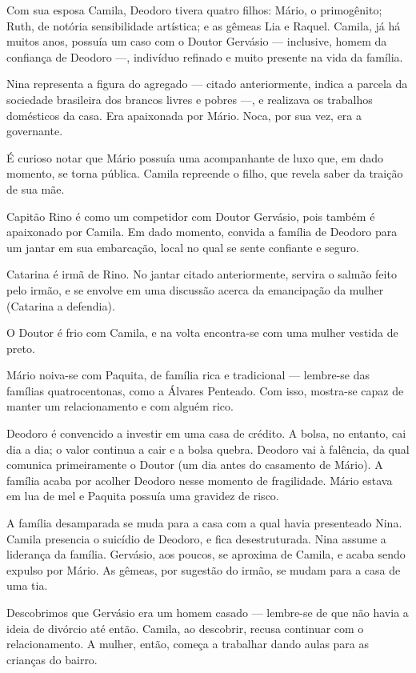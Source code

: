 Com sua esposa Camila, Deodoro tivera quatro filhos: Mário, o primogênito; Ruth, de notória sensibilidade artística; e as gêmeas Lia e Raquel. Camila, já há muitos anos, possuía um caso com o Doutor Gervásio — inclusive, homem da confiança de Deodoro —, indivíduo refinado e muito presente na vida da família.

Nina representa a figura do agregado — citado anteriormente, indica a parcela da sociedade brasileira dos brancos livres e pobres —, e realizava os trabalhos domésticos da casa. Era apaixonada por Mário. Noca, por sua vez, era a governante.

É curioso notar que Mário possuía uma acompanhante de luxo que, em dado momento, se torna pública. Camila repreende o filho, que revela saber da traição de sua mãe.

Capitão Rino é como um competidor com Doutor Gervásio, pois também é apaixonado por Camila. Em dado momento, convida a família de Deodoro para um jantar em sua embarcação, local no qual se sente confiante e seguro.

Catarina é irmã de Rino. No jantar citado anteriormente, servira o salmão feito pelo irmão, e se envolve em uma discussão acerca da emancipação da mulher (Catarina a defendia).

O Doutor é frio com Camila, e na volta encontra-se com uma mulher vestida de preto.

Mário noiva-se com Paquita, de família rica e tradicional — lembre-se das famílias quatrocentonas, como a Álvares Penteado. Com isso, mostra-se capaz de manter um relacionamento e com alguém rico.

Deodoro é convencido a investir em uma casa de crédito. A bolsa, no entanto, cai dia a dia; o valor continua a cair e a bolsa quebra. Deodoro vai à falência, da qual comunica primeiramente o Doutor (um dia antes do casamento de Mário). A família acaba por acolher Deodoro nesse momento de fragilidade. Mário estava em lua de mel e Paquita possuía uma gravidez de risco.

A família desamparada se muda para a casa com a qual havia presenteado Nina. Camila presencia o suicídio de Deodoro, e fica desestruturada. Nina assume a liderança da família. Gervásio, aos poucos, se aproxima de Camila, e acaba sendo expulso por Mário. As gêmeas, por sugestão do irmão, se mudam para a casa de uma tia.

Descobrimos que Gervásio era um homem casado — lembre-se de que não havia a ideia de divórcio até então. Camila, ao descobrir, recusa continuar com o relacionamento. A mulher, então, começa a trabalhar dando aulas para as crianças do bairro.

